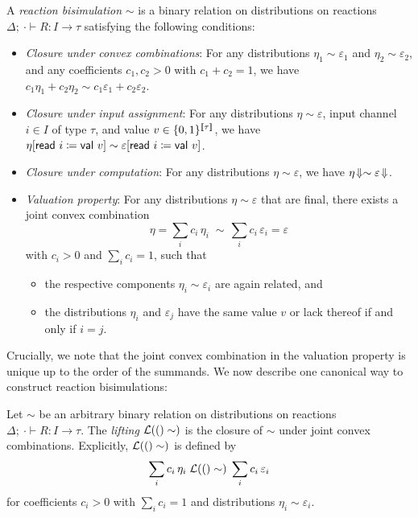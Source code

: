 \begin{definition}
A \emph{reaction bisimulation} $\sim$ is a binary relation on distributions on reactions $\Delta; \ \cdot \vdash R : I \to \tau$ satisfying the following conditions:
\begin{itemize}
\item \emph{Closure under convex combinations}: For any distributions $\eta_1 \sim \varepsilon_1$ and $\eta_2 \sim \varepsilon_2$, and any coefficients $c_1, c_2 > 0$ with $c_1 + c_2 = 1$, we have $c_1 \eta_1 + c_2 \eta_2 \sim c_1 \varepsilon_1 + c_2 \varepsilon_2$.

\item \emph{Closure under input assignment}: For any distributions $\eta \sim \varepsilon$, input channel $i \in I$ of type $\tau$, and value $v \in \{0,1\}^{\llbracket \tau \rrbracket}$, we have $\eta[\mathsf{read} \ i \coloneqq \mathsf{val} \ v] \sim \varepsilon[\mathsf{read} \ i \coloneqq \mathsf{val} \ v]$.

\item \emph{Closure under computation}: For any distributions $\eta \sim \varepsilon$, we have $\eta \! \Downarrow \sim \varepsilon \! \Downarrow$.

\item \emph{Valuation property}: For any distributions $\eta \sim \varepsilon$ that are final, there exists a joint convex combination \[\eta = \sum_i c_i \, \eta_i \; \sim \, \sum_i c_i \, \varepsilon_i = \varepsilon\]
with $c_i > 0$ and $\sum_i c_i = 1$, such that
\begin{itemize}
\item the respective components $\eta_i \sim \varepsilon_i$ are again related, and
\item the distributions $\eta_i$ and $\varepsilon_j$ have the same value $v$ or lack thereof if and only if $i = j$.
\end{itemize}
\end{itemize}
\end{definition}

\noindent Crucially, we note that the joint convex combination in the valuation property is unique up to the order of the summands. We now describe one canonical way to construct reaction bisimulations:

\begin{definition}
Let $\sim$ be an arbitrary binary relation on distributions on reactions $\Delta; \ \cdot \vdash R : I \to \tau$. The \emph{lifting} $\mathcal{L}(()\sim)$ is the closure of $\sim$ under joint convex combinations. Explicitly, $\mathcal{L}(()\sim)$ is defined by
\[\sum_i c_i \, \eta_i \; \mathcal{L}(()\sim) \; \sum_i c_i \, \varepsilon_i\]
for coefficients $c_i > 0$ with $\sum_i c_i = 1$ and distributions $\eta_i \sim \varepsilon_i$.
\end{definition}

